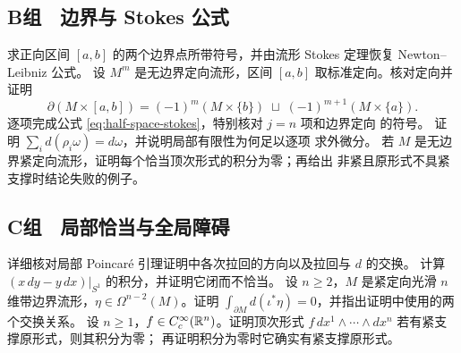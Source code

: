 \subsection*{B组　边界与 Stokes 公式}
\begin{enumerate}[label=\textbf{\thechapter.\arabic*.},resume]
 求正向区间 $[a,b]$ 的两个边界点所带符号，并由流形 Stokes 定理恢复
 Newton--Leibniz 公式。
 设 $M^m$ 是无边界定向流形，区间 $[a,b]$ 取标准定向。核对定向并证明
 \[
 \partial(M\times[a,b])
 =(-1)^m(M\times\{b\})\;\sqcup\;(-1)^{m+1}(M\times\{a\}).
 \]
 逐项完成公式 \eqref{eq:half-space-stokes}，特别核对 $j=n$ 项和边界定向
 的符号。
 证明 $\sum_i d(\rho_i\omega)=d\omega$，并说明局部有限性为何足以逐项
 求外微分。
 若 $M$ 是无边界紧定向流形，证明每个恰当顶次形式的积分为零；再给出
 非紧且原形式不具紧支撑时结论失败的例子。
\end{enumerate}

\subsection*{C组　局部恰当与全局障碍}
\begin{enumerate}[label=\textbf{\thechapter.\arabic*.},resume]
 详细核对局部 Poincaré 引理证明中各次拉回的方向以及拉回与 $d$ 的交换。
 计算 $(x\,dy-y\,dx)|_{S^1}$ 的积分，并证明它闭而不恰当。
 设 $n\ge2$，$M$ 是紧定向光滑 $n$ 维带边界流形，$\eta\in\Omega^{n-2}(M)$。证明
 $\int_{\partial M}d(\iota^*\eta)=0$，并指出证明中使用的两个交换关系。
 设 $n\ge1$，$f\in C_c^\infty(\mathbb{R}^n)$。证明顶次形式
 $f\,dx^1\wedge\cdots\wedge dx^n$ 若有紧支撑原形式，则其积分为零；
 再证明积分为零时它确实有紧支撑原形式。
\end{enumerate}
